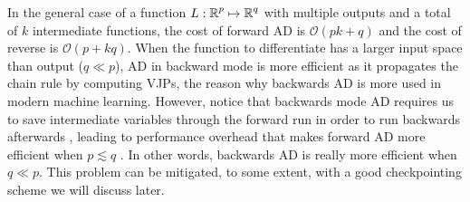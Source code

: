 In the general case of a function $L : \operatorname{\mathbb{R}}^p \mapsto \operatorname{\mathbb{R}}^q$ with multiple outputs and a total of $k$ intermediate functions, the cost of forward AD is $\mathcal O (pk + q)$ and the cost of reverse is $\mathcal O (p + kq)$.
When the function to differentiate has a larger input space than output ($q \ll p$), AD in backward mode is more efficient as it propagates the chain rule by computing VJPs, the reason why backwards AD is more used in modern machine learning.
However, notice that backwards mode AD requires us to save intermediate variables through the forward run in order to run backwards afterwards \cite{Bennett_1973}, leading to performance overhead that makes forward AD more efficient when $p \lesssim q$ \cite{Griewank_1989, Margossian_2018, Baydin_Pearlmutter_Radul_Siskind_2015}.  
In other words, backwards AD is really more efficient when $q \ll p$. 
This problem can be mitigated, to some extent, with a good checkpointing scheme we will discuss later. 

